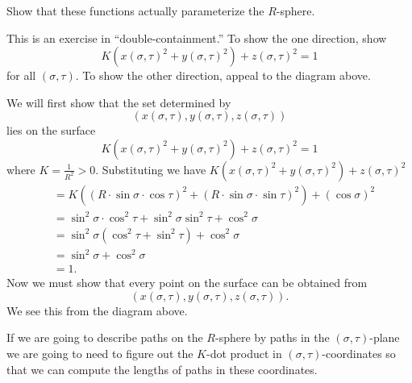 \documentclass{ximera}
\begin{document}
\begin{problem}
  Show that these functions actually parameterize the $R$-sphere.
\begin{hint}
This is an exercise in ``double-containment.'' To show the one direction, show
\[
K\left(x(\sigma,\tau) ^{2}+y(\sigma,\tau) ^{2}\right) +z(\sigma,\tau)^{2} = 1
\]
for all $(\sigma,\tau)$. To show the other direction, appeal to the
diagram above.
\end{hint}
\begin{freeResponse}
  We will first show that the set determined by
  \[
  \left(x(\sigma,\tau), y(\sigma,\tau), z(\sigma,\tau)\right)
  \]
  lies on the surface
  \[
  K\left(x(\sigma,\tau) ^{2}+y(\sigma,\tau) ^{2}\right) +z(\sigma,\tau)^{2} = 1
  \]
  where $K=\frac{1}{R^2}>0$. Substituting we have
  $K\left(x(\sigma,\tau) ^{2}+y(\sigma,\tau) ^{2}\right)
  +z(\sigma,\tau)^{2}$
  \begin{align*}
    &=K\left((R\cdot\sin\sigma\cdot\cos\tau)^{2}+(R\cdot\sin\sigma\cdot\sin\tau)^{2}\right) +(\cos\sigma)^{2} \\
    &= \sin^2\sigma\cdot\cos^2\tau+\sin^2\sigma\sin^2\tau + \cos^2\sigma \\
    &= \sin^2\sigma(\cos^2\tau+\sin^2\tau) + \cos^2\sigma \\
    &= \sin^2\sigma + \cos^2\sigma \\
    &=1.
  \end{align*}
  Now we must show that every point on the surface can be obtained from
  \[
  \left(x(\sigma,\tau), y(\sigma,\tau), z(\sigma,\tau)\right).
  \]
  We see this from the diagram above. 
\end{freeResponse}
\end{problem}




If we are going to describe paths on the $R$-sphere by paths in the
$(\sigma,\tau)$-plane we are going to need to figure out the $K$-dot
product in $(\sigma,\tau)$-coordinates so that we can compute the
lengths of paths in these coordinates.
\end{document}
